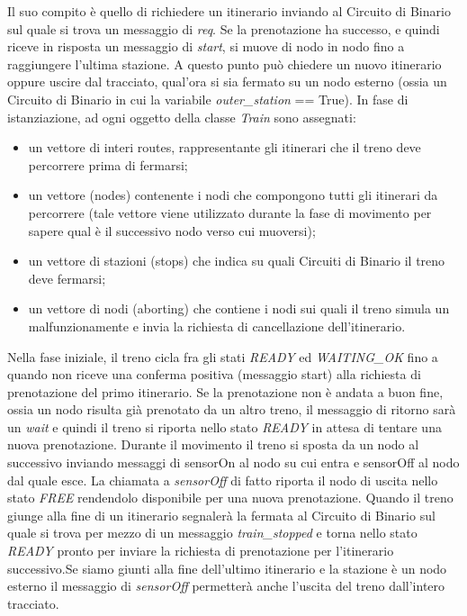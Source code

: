 Il suo compito è quello di richiedere un itinerario inviando al Circuito di
Binario sul quale si trova un messaggio di \textit{req}. Se la prenotazione ha
successo, e quindi riceve in risposta un messaggio di \textit{start}, si muove
di nodo in nodo fino a raggiungere l’ultima stazione. A questo punto può
chiedere un nuovo itinerario oppure uscire dal tracciato, qual’ora si sia
fermato su un nodo esterno (ossia un Circuito di Binario in cui la variabile
\textit{outer\_station} == True).
In fase di istanziazione, ad ogni oggetto della classe \textit{Train} sono
assegnati:
\begin{itemize}
  \item un vettore di interi routes, rappresentante gli itinerari che il treno
  deve percorrere prima di fermarsi; 
  \item un vettore (nodes) contenente i nodi che compongono tutti gli
  itinerari da percorrere (tale vettore viene utilizzato durante la fase di
  movimento per sapere qual è il successivo nodo verso cui muoversi);
  \item un vettore di stazioni (stops) che indica su quali Circuiti di Binario
  il treno deve fermarsi;
  \item un vettore di nodi (aborting) che contiene i nodi sui quali il treno
  simula un malfunzionamente e invia la richiesta di cancellazione dell’itinerario.
\end{itemize}
Nella fase iniziale, il treno cicla fra gli stati \textit{READY} ed
\textit{WAITING\_OK} fino a quando non riceve una conferma positiva (messaggio
start) alla richiesta di prenotazione del primo itinerario. Se la prenotazione
non è andata a buon fine, ossia un nodo risulta già prenotato da un altro treno,
il messaggio di ritorno sarà un \textit{wait} e quindi il treno si riporta nello
stato \textit{READY} in attesa di tentare una nuova prenotazione.
Durante il movimento il treno si sposta da un nodo al successivo inviando messaggi
di sensorOn al nodo su cui entra e sensorOff al nodo dal quale esce. La chiamata
a \textit{sensorOff} di fatto riporta il nodo di uscita nello stato
\textit{FREE} rendendolo disponibile per una nuova prenotazione.
Quando il treno giunge alla fine di un itinerario segnalerà la fermata al
Circuito di Binario sul quale si trova per mezzo di un messaggio
\textit{train\_stopped} e torna nello stato \textit{READY} pronto per inviare la
richiesta di prenotazione per l’itinerario successivo.Se siamo giunti alla fine
dell’ultimo itinerario e la stazione è un nodo esterno il messaggio 
di \textit{sensorOff} permetterà anche l’uscita del treno dall’intero tracciato.

